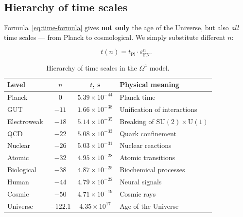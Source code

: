\documentclass[11pt,a4paper]{article}
\newcommand{\SU}{\mathrm{SU}}
\newcommand{\Om}{\Omega^4}
\newcommand{\epsFN}{\varepsilon_{\text{FN}}}
\theoremstyle{definition}
\begin{document}
\subsection{Hierarchy of time scales}
\label{subsec:time-hierarchy}

Formula~\eqref{eq:time-formula} gives \textbf{not only} the age 
of the Universe, but also \emph{all} time scales — from Planck to 
cosmological. We simply substitute different $n$:

\begin{equation}
    \boxed{
    t(n) = t_{\text{Pl}} \cdot \epsFN^n.
    }
    \label{eq:time-hierarchy}
\end{equation}

\begin{table}[htbp]
\centering
\caption{Hierarchy of time scales in the $\Om$ model.}
\label{tab:time-hierarchy}
\begin{tabular}{lccl}
\toprule
Level & $n$ & $t$, s & Physical meaning \\
\midrule
Planck & $0$ & $5.39 \times 10^{-44}$ & Planck time \\
GUT & $-11$ & $1.66 \times 10^{-38}$ & Unification of interactions \\
Electroweak & $-18$ & $5.14 \times 10^{-35}$ & Breaking of $\SU(2) \times \mathrm{U}(1)$ \\
QCD & $-22$ & $5.08 \times 10^{-33}$ & Quark confinement \\
Nuclear & $-26$ & $5.03 \times 10^{-31}$ & Nuclear reactions \\
Atomic & $-32$ & $4.95 \times 10^{-28}$ & Atomic transitions \\
Biological & $-38$ & $4.87 \times 10^{-25}$ & Biochemical processes \\
Human & $-44$ & $4.79 \times 10^{-22}$ & Neural signals \\
Cosmic & $-50$ & $4.71 \times 10^{-19}$ & Cosmic rays \\
Universe & $-122.1$ & $4.35 \times 10^{17}$ & Age of the Universe \\
\bottomrule
\end{tabular}
\end{table}
\end{document}
